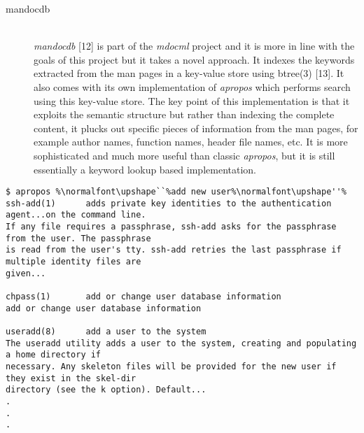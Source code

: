 \documentclass[letterpaper,twocolumn,10pt]{article}
\begin{document}
\begin{description}
\item[mandocdb] \hfill \\
\textit{mandocdb} [12] is part of the \textit{mdocml} project and it is more in
line with the goals of this project but it
takes a novel approach. It indexes the keywords extracted from the man pages in a
key-value store using btree(3) [13]. It also comes with its own implementation
of \textit{apropos} which performs search using this key-value store. The
key point of this implementation is that it exploits the semantic structure
but rather than indexing the complete content, it plucks out specific pieces of
information from the man pages, for example author names, function names,
header file names, etc. It is more sophisticated and much more useful than
classic
\textit{apropos}, but it is still essentially a keyword lookup based
implementation.
\end{description}

{ \small
{}
\begin{lstlisting}[float=*]
$ apropos %\normalfont\upshape``%add new user%\normalfont\upshape''%
ssh-add(1)      adds private key identities to the authentication agent...on the command line.
If any file requires a passphrase, ssh-add asks for the passphrase from the user. The passphrase
is read from the user's tty. ssh-add retries the last passphrase if multiple identity files are
given...

chpass(1)       add or change user database information
add or change user database information

useradd(8)      add a user to the system
The useradd utility adds a user to the system, creating and populating a home directory if
necessary. Any skeleton files will be provided for the new user if they exist in the skel-dir
directory (see the k option). Default...
.
.
.
\end{lstlisting}
}
\end{document}
